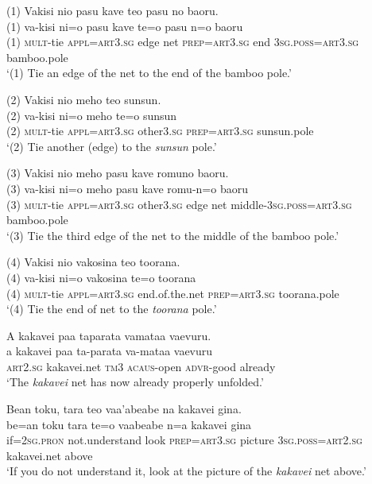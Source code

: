 \ea\label{ex:text22-71}
(1) Vakisi nio pasu kave teo pasu no baoru.\\
\gll (1)	va-kisi	ni=o	pasu	kave	te=o	pasu	n=o	baoru\\
     (1)	\textsc{mult}-tie	\textsc{appl}=\textsc{art}3.\textsc{sg}	edge	net	\textsc{prep}=\textsc{art}3.\textsc{sg}	end	3\textsc{sg}.\textsc{poss}=\textsc{art}3.\textsc{sg}	bamboo.pole\\
\glt `(1) Tie an edge of the net to the end of the bamboo pole.'
\z

\ea\label{ex:text22-72}
(2) Vakisi nio meho teo sunsun.\\
\gll (2)	va-kisi	ni=o	meho	te=o	sunsun\\
     (2)	\textsc{mult}-tie	\textsc{appl}=\textsc{art}3.\textsc{sg}	other3.\textsc{sg}	\textsc{prep}=\textsc{art}3.\textsc{sg}	sunsun.pole\\
\glt `(2) Tie another (edge) to the \textit{sunsun} pole.'
\z

\ea\label{ex:text22-73}
(3) Vakisi nio meho pasu kave romuno baoru.\\
\gll (3)	va-kisi	ni=o	meho	pasu	kave	romu-n=o	baoru\\
     (3)	\textsc{mult}-tie	\textsc{appl}=\textsc{art}3.\textsc{sg}	other3.\textsc{sg}	edge	net	middle-3\textsc{sg}.\textsc{poss}=\textsc{art}3.\textsc{sg}	bamboo.pole\\
\glt `(3) Tie the third edge of the net to the middle of the bamboo pole.'
\z

\ea\label{ex:text22-74}
(4) Vakisi nio vakosina teo toorana.\\
\gll (4)	va-kisi	ni=o	vakosina	te=o	toorana\\
     (4)	\textsc{mult}-tie	\textsc{appl}=\textsc{art}3.\textsc{sg}	end.of.the.net	\textsc{prep}=\textsc{art}3.\textsc{sg}	toorana.pole\\
\glt `(4) Tie the end of net to the \textit{toorana} pole.'
\z

\ea\label{ex:text22-75}
A kakavei paa taparata vamataa vaevuru.\\
\gll a	kakavei	paa	ta-parata	va-mataa	vaevuru\\
     \textsc{art}2.\textsc{sg}	kakavei.net	\textsc{tm}3	\textsc{acaus}-open	\textsc{advr}-good	already\\
\glt `The \textit{kakavei} net has now already properly unfolded.'
\z

\newpage
\ea\label{ex:text22-76}
Bean toku, tara teo vaa'abeabe na kakavei gina.\\
\gll be=an	toku	tara	te=o	vaabeabe	n=a	kakavei	gina\\
     if=2\textsc{sg}.\textsc{pron}	not.understand	look	\textsc{prep}=\textsc{art}3.\textsc{sg}	picture	3\textsc{sg}.\textsc{poss}=\textsc{art}2.\textsc{sg}	kakavei.net	above\\
\glt `If you do not understand it, look at the picture of the \textit{kakavei} net above.'
\z

